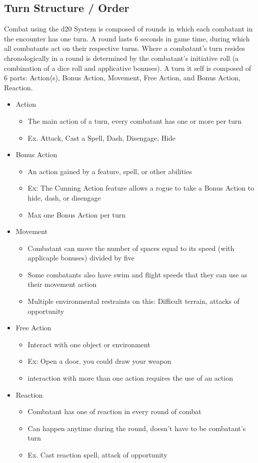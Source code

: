 \documentclass[12pt,a4paper]{report}
\begin{document}
	\subsection{Turn Structure / Order}
	Combat using the d20 System is composed of rounds in which each combatant in the encounter has one turn.  A round lasts 6 seconds in game time, during which all combatants act on their respective turns. Where a combatant's turn resides chronologically in a round is determined by the combatant's initiative roll (a combination of a dice roll and applicative bonuses). A turn it self is composed of 6 parts: Action(s), Bonus Action, Movement, Free Action, and Bonus Action, Reaction.
	\begin{itemize}
		\item Action
			\begin{itemize}
				\item The main action of a turn, every combatant has one or more per turn
				\item Ex. Attack, Cast a Spell, Dash, Disengage, Hide
			\end{itemize}
		\item Bonus Action
			\begin{itemize}
				\item An action gained by a feature, spell, or other abilities
				\item Ex: The Cunning Action feature allows a rogue to take a Bonus Action to hide, dash, or disengage
				\item Max one Bonus Action per turn
			\end{itemize}
		\item Movement
			\begin{itemize}
				\item Combatant can move the number of spaces equal to its speed (with applicaple bonuses) divided by five
				\item Some combatants also have swim and flight speeds that they can use as their movement action
				\item Multiple environmental restraints on this: Difficult terrain, attacks of opportunity
			\end{itemize}
		\item Free Action
			\begin{itemize}
				\item Interact with one object or environment 
				\item Ex: Open a door, you could draw your weapon
				\item interaction with more than one action requires the use of an action
			\end{itemize}
		\item Reaction
			\begin{itemize}
				\item Combatant has one of reaction in every round of combat
				\item Can happen anytime during the round, doesn't have to be combatant's turn
				\item Ex. Cast reaction spell, attack of opportunity
			\end{itemize}
	\end{itemize}
\end{document}
